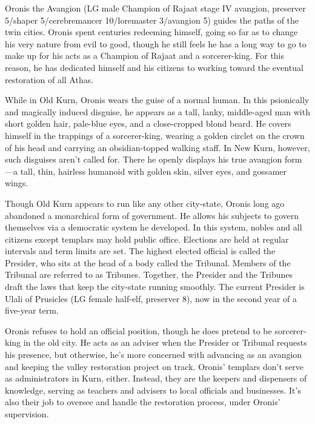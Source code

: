 {
	Oronis the Avangion (LG male Champion of Rajaat stage IV avangion, preserver 5/shaper 5/cerebremancer 10/loremaster 3/avangion 5) guides the paths of the twin cities. Oronis spent centuries redeeming himself, going so far as to change his very nature from evil to good, though he still feels he has a long way to go to make up for his acts as a Champion of Rajaat and a sorcerer-king. For this reason, he has dedicated himself and his citizens to working toward the eventual restoration of all Athas.

	While in Old Kurn, Oronis wears the guise of a normal human. In this psionically and magically induced disguise, he appears as a tall, lanky, middle-aged man with short golden hair, pale-blue eyes, and a close-cropped blond beard. He covers himself in the trappings of a sorcerer-king, wearing a golden circlet on the crown of his head and carrying an obsidian-topped walking staff. In New Kurn, however, such disguises aren't called for. There he openly displays his true avangion form---a tall, thin, hairless humanoid with golden skin, silver eyes, and gossamer wings.

	Though Old Kurn appears to run like any other city-state, Oronis long ago abandoned a monarchical form of government. He allows his subjects to govern themselves via a democratic system he developed. In this system, nobles and all citizens except templars may hold public office. Elections are held at regular intervals and term limits are set. The highest elected official is called the Presider, who sits at the head of a body called the Tribunal. Members of the Tribunal are referred to as Tribunes. Together, the Presider and the Tribunes draft the laws that keep the city-state running smoothly. The current Presider is Ulali of Prusicles (LG female half-elf, preserver 8), now in the second year of a five-year term.

	Oronis refuses to hold an official position, though he does pretend to be sorcerer-king in the old city. He acts as an adviser when the Presider or Tribunal requests his presence, but otherwise, he's more concerned with advancing as an avangion and keeping the valley restoration project on track. Oronis' templars don't serve as administrators in Kurn, either. Instead, they are the keepers and dispensers of knowledge, serving as teachers and advisers to local officials and businesses. It's also their job to oversee and handle the restoration process, under Oronis' supervision.
}
